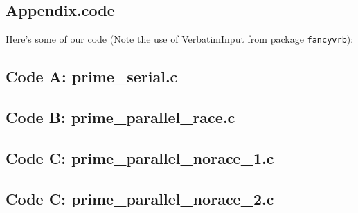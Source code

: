 \documentclass[11pt]{article}
\begin{document}
\begin{enumerate}
\section{Appendix.code}

Here's some of our code (Note the use of VerbatimInput from package \texttt{fancyvrb}):


\subsection{Code A: prime\_serial.c}


\begin{footnotesize}

\end{footnotesize}




\subsection{Code B: prime\_parallel\_race.c}


\begin{footnotesize}

\end{footnotesize}



\subsection{Code C: prime\_parallel\_norace\_1.c}


\begin{footnotesize}

\end{footnotesize}



\subsection{Code C: prime\_parallel\_norace\_2.c}


\end{enumerate}
\end{document}
